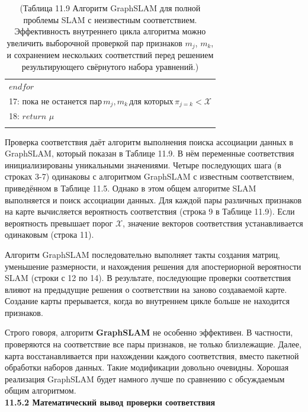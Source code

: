 \documentclass[10pt,a4paper]{article}
\begin{document}
\begin{table}[H]
\begin{center}
\begin{tabular}{|l|}
$\textit{endfor}$\\
17:\hspace{4mm}
$\textit{пока не останется пар}\, m_j,m_k\, \textit{для которых}\, \pi_{j=k}<\mathcal{X}$\\
18:\hspace{4mm}
$\textit{return}\,\,\mu$\\
{}\\
\hline
\end{tabular}
\caption{(Таблица 11.9 Алгоритм GraphSLAM для полной проблемы SLAM с неизвестным соответствием. Эффективность внутреннего цикла алгоритма можно увеличить выборочной проверкой пар признаков $m_j$, $m_k$, и сохранением нескольких соответствий перед решением результирующего свёрнутого набора уравнений.)}
\end{center}
\end{table}

Проверка соответствия даёт алгоритм выполнения поиска ассоциации данных в GraphSLAM, который показан в Таблице 11.9. В нём  переменные соответствия инициализированы уникальными значениями. Четыре последующих шага (в строках 3-7) одинаковы с алгоритмом GraphSLAM с известным соответствием, приведённом в Таблице 11.5. Однако в этом общем алгоритме SLAM выполняется и поиск ассоциации данных. Для каждой пары различных признаков на карте вычисляется вероятность соответствия (строка 9 в Таблице 11.9). Если вероятность превышает порог $\mathcal{X}$, значение векторов соответствия устанавливается одинаковым (строка 11).

Алгоритм GraphSLAM последовательно выполняет такты создания матриц, уменьшение размерности, и нахождения решения для апостериорной вероятности SLAM (строки с 12 по 14). В результате, последующие проверки соответствия влияют на предыдущие решения о соответствии на заново создаваемой карте. Создание карты прерывается, когда во внутреннем цикле больше не находится признаков.

Строго говоря, алгоритм \textbf{GraphSLAM} не особенно эффективен. В частности, проверяются на соответствие все пары признаков, не только близлежащие. Далее, карта восстанавливается при нахождении каждого соответствия, вместо пакетной обработки наборов данных. Такие модификации довольно очевидны. Хорошая реализация GraphSLAM будет намного лучше по сравнению с обсуждаемым общим алгоритмом.\\

\textbf{11.5.2	Математический вывод проверки соответствия}\\
\end{document}
